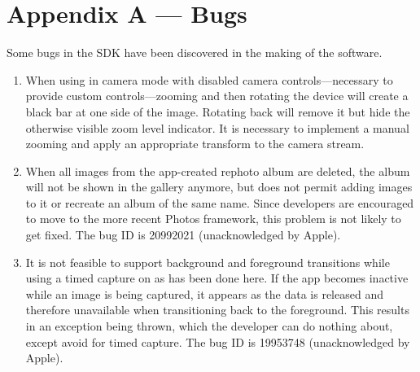 \chapter{Appendix A --- Bugs}

Some bugs in the SDK have been discovered in the making of the software.
\begin{enumerate}

   \item When using  in camera mode with disabled
      camera controls---necessary to provide custom controls---zooming and then
      rotating the device will create a black bar at one side of the image.
      Rotating back will remove it but hide the otherwise visible zoom level
      indicator. It is necessary to implement a manual zooming and apply an
      appropriate transform to the camera stream.

   \item When all images from the app-created rephoto album are deleted, the
      album will not be shown in the gallery anymore, but 
      does not permit adding images to it or recreate an album of the same name.
      Since developers are encouraged to move to the more recent Photos
      framework, this problem is not likely to get fixed. The bug ID is
      20992021 (unacknowledged by Apple).

   \item It is not feasible to support background and foreground transitions
      while using a timed capture on  as has been
      done here. If the app becomes inactive while an image is being captured,
      it appears as the data is released and therefore unavailable when
      transitioning back to the foreground. This results in an exception being
      thrown, which the developer can do nothing about, except avoid
       for timed capture. The bug ID is 19953748
      (unacknowledged by Apple).
\end{enumerate}
